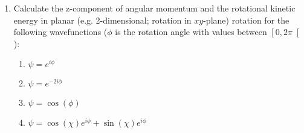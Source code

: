 \begin{enumerate}

\item Calculate the z-component of angular momentum and the rotational kinetic energy in planar (e.g. 2-dimensional; rotation in $xy$-plane) rotation for the following wavefunctions ($\phi$ is the rotation angle with values between $\left[0, 2\pi\right[$):

\begin{enumerate}
\item $\psi = e^{i\phi}$
\item $\psi = e^{-2i\phi}$
\item $\psi = \cos(\phi)$
\item $\psi = \cos(\chi)e^{i\phi} + \sin(\chi)e^{i\phi}$
\end{enumerate}


\end{enumerate}
